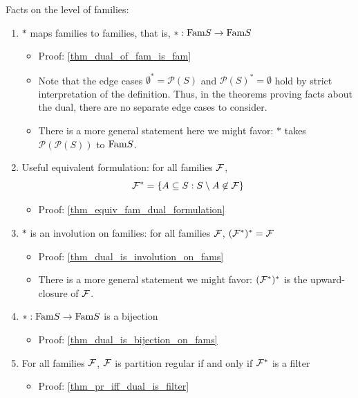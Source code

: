 Facts on the level of families:
\begin{enumerate}
    \item $*$ maps families to families, that is, $*: \text{Fam}{S} \to \text{Fam}{S}$
    \begin{itemize}
        \item Proof: \cref{thm_dual_of_fam_is_fam}
        \item Note that the edge cases $\emptyset^* = \mathcal{P}(S)$ and $\mathcal{P}(S)^* = \emptyset$ hold by strict interpretation of the definition.  Thus, in the theorems proving facts about the dual, there are no separate edge cases to consider.
        \item There is a more general statement here we might favor: $*$ takes $\mathcal{P}(\mathcal{P}(S))$ to $\text{Fam}{S}$.
    \end{itemize}
    
    \item Useful equivalent formulation: for all families $\mathcal{F}$,
    \[\mathcal{F}^* = \{A \subseteq S : S \setminus A \not\in \mathcal{F}\}\]
    \begin{itemize}
        \item Proof: \cref{thm_equiv_fam_dual_formulation}
    \end{itemize}
    
    \item $*$ is an involution on families: for all families $\mathcal{F}$, $(\mathcal{F}^*)^* = \mathcal{F}$
    \begin{itemize}
        \item Proof: \cref{thm_dual_is_involution_on_fams}
        \item There is a more general statement we might favor: $(\mathcal{F}^*)^*$ is the upward-closure of $\mathcal{F}$.
    \end{itemize}

    \item $*: \text{Fam}{S} \to \text{Fam}{S}$ is a bijection
    \begin{itemize}
        \item Proof: \cref{thm_dual_is_bijection_on_fams}
    \end{itemize}

    \item For all families $\mathcal{F}$, $\mathcal{F}$ is partition regular if and only if $\mathcal{F}^*$ is a filter
    \begin{itemize}
        \item Proof: \cref{thm_pr_iff_dual_is_filter}
    \end{itemize}
\end{enumerate}

